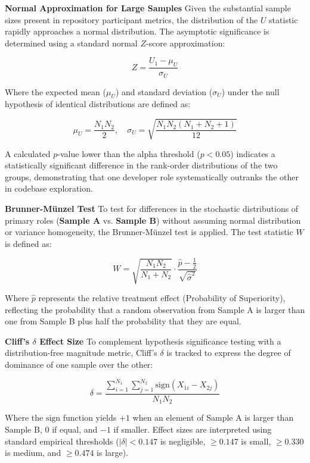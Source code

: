 \textbf{Normal Approximation for Large Samples}
Given the substantial sample sizes present in repository participant metrics, the distribution of the $U$ statistic rapidly approaches a normal distribution. The asymptotic significance is determined using a standard normal $Z$-score approximation:

\begin{equation}
    Z = \frac{U_1 - \mu_U}{\sigma_U}
\end{equation}

Where the expected mean ($\mu_U$) and standard deviation ($\sigma_U$) under the null hypothesis of identical distributions are defined as:

\begin{equation}
    \mu_U = \frac{N_1 N_2}{2}, \quad \sigma_U = \sqrt{\frac{N_1 N_2 (N_1 + N_2 + 1)}{12}}
    \label{eq:mwu_normal}
\end{equation}

A calculated $p$-value lower than the alpha threshold ($p < 0.05$) indicates a statistically significant difference in the rank-order distributions of the two groups, demonstrating that one developer role systematically outranks the other in codebase exploration.


\textbf{Brunner-Münzel Test}
To test for differences in the stochastic distributions of primary roles (\textbf{Sample A} vs. \textbf{Sample B}) without assuming normal distribution or variance homogeneity, the Brunner-Münzel test is applied. The test statistic $W$ is defined as:

\begin{equation}
    W = \sqrt{\frac{N_1 N_2}{N_1 + N_2}} \cdot \frac{\hat{p} - \frac{1}{2}}{\sqrt{\hat{\sigma}^2}}
\end{equation}

Where $\hat{p}$ represents the relative treatment effect (Probability of Superiority), reflecting the probability that a random observation from Sample A is larger than one from Sample B plus half the probability that they are equal.

\textbf{Cliff's $\delta$ Effect Size}
To complement hypothesis significance testing with a distribution-free magnitude metric, Cliff's $\delta$ is tracked to express the degree of dominance of one sample over the other:

\begin{equation}
    \delta = \frac{\sum_{i=1}^{N_1} \sum_{j=1}^{N_2} \mathrm{sign}(X_{1i} - X_{2j})}{N_1 N_2}
\end{equation}

Where the $\mathrm{sign}$ function yields $+1$ when an element of Sample A is larger than Sample B, $0$ if equal, and $-1$ if smaller. Effect sizes are interpreted using standard empirical thresholds ($|\delta| < 0.147$ is negligible, $\ge 0.147$ is small, $\ge 0.330$ is medium, and $\ge 0.474$ is large).

\newpage 
